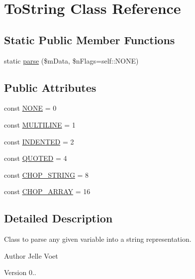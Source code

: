 \hypertarget{class_to_string}{\section{To\-String Class Reference}
\label{class_to_string}
}
\subsection*{Static Public Member Functions}
\begin{DoxyCompactItemize}
\item 
static \hyperlink{class_to_string_ab8265bdd4b8e32854feb4c21242533be}{parse} (\$m\-Data, \$n\-Flags=self\-::\-N\-O\-N\-E)
\end{DoxyCompactItemize}
\subsection*{Public Attributes}
\begin{DoxyCompactItemize}
\item 
const \hyperlink{class_to_string_af0b8a90e418aa81ea6d32e343ebf63f5}{N\-O\-N\-E} = 0
\item 
const \hyperlink{class_to_string_ae96d53863a3dce97aae84f68fa69f77f}{M\-U\-L\-T\-I\-L\-I\-N\-E} = 1
\item 
const \hyperlink{class_to_string_ae7b63380653281e848f43b1e80453104}{I\-N\-D\-E\-N\-T\-E\-D} = 2
\item 
const \hyperlink{class_to_string_af5dec33b7dc8c795ad626944cfcd629f}{Q\-U\-O\-T\-E\-D} = 4
\item 
const \hyperlink{class_to_string_ad1f58ce47b39958c1f0a9817275f527b}{C\-H\-O\-P\-\_\-\-S\-T\-R\-I\-N\-G} = 8
\item 
const \hyperlink{class_to_string_aec7fb7dd62edc352ec15d003b790e660}{C\-H\-O\-P\-\_\-\-A\-R\-R\-A\-Y} = 16
\end{DoxyCompactItemize}


\subsection{Detailed Description}
Class to parse any given variable into a string representation.

\begin{DoxyAuthor}{Author}
Jelle Voet 
\end{DoxyAuthor}
\begin{DoxyVersion}{Version}
0.. 
\end{DoxyVersion}


